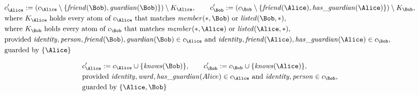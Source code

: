 \begin{align*}
&
c'_
{
\Alice
}
 := 
(c_
{
\Alice
}
 \setminus 
\{
\mathit{\detokenize{
friend
}}
(
\Bob
)
,
\mathit{\detokenize{
guardian
}}
(
\Bob
)
\}
) \setminus K_
{
\Alice
}
, \qquad 
c'_
{
\Bob
}
 := 
(c_
{
\Bob
}
 \setminus 
\{
\mathit{\detokenize{
friend
}}
(
\Alice
)
,
\mathit{\detokenize{
has_guardian
}}
(
\Alice
)
\}
) \setminus K_
{
\Bob
}
,\\
&
\text{where } K_
{
\Alice
}
 \text{ holds every atom of } c_
{
\Alice
}
 \text{ that matches } 
\mathit{\detokenize{
member
}}
(
\ast
,
\Bob
)
 \text{ or } 
\mathit{\detokenize{
listed
}}
(
\Bob
,
\ast
)
,\\
&
\text{where } K_
{
\Bob
}
 \text{ holds every atom of } c_
{
\Bob
}
 \text{ that matches } 
\mathit{\detokenize{
member
}}
(
\ast
,
\Alice
)
 \text{ or } 
\mathit{\detokenize{
listed
}}
(
\Alice
,
\ast
)
,\\
&
\text{provided } 
\mathit{\detokenize{
identity
}}
,
\mathit{\detokenize{
person
}}
,
\mathit{\detokenize{
friend
}}
(
\Bob
)
,
\mathit{\detokenize{
guardian
}}
(
\Bob
)
 \in c_
{
\Alice
}
 \text{ and } 
\mathit{\detokenize{
identity
}}
,
\mathit{\detokenize{
friend
}}
(
\Alice
)
,
\mathit{\detokenize{
has_guardian
}}
(
\Alice
)
 \in c_
{
\Bob
}
,\\
&
\text{guarded by } \{
\Alice
\}
\end{align*}

\begin{align*}
&
c'_
{
\Alice
}
 := 
c_
{
\Alice
}
 \cup 
\{
\mathit{\detokenize{
knows
}}
(
\Bob
)
\}
, \qquad 
c'_
{
\Bob
}
 := 
c_
{
\Bob
}
 \cup 
\{
\mathit{\detokenize{
knows
}}
(
\Alice
)
\}
,\\
&
\text{provided } 
\mathit{\detokenize{
identity
}}
,
\mathit{\detokenize{
ward
}}
,
\mathit{\detokenize{
has_guardian
}}
(
Alice
)
 \in c_
{
\Alice
}
 \text{ and } 
\mathit{\detokenize{
identity
}}
,
\mathit{\detokenize{
person
}}
 \in c_
{
\Bob
}
,\\
&
\text{guarded by } \{
\Alice
,
\Bob
\}
\end{align*}

